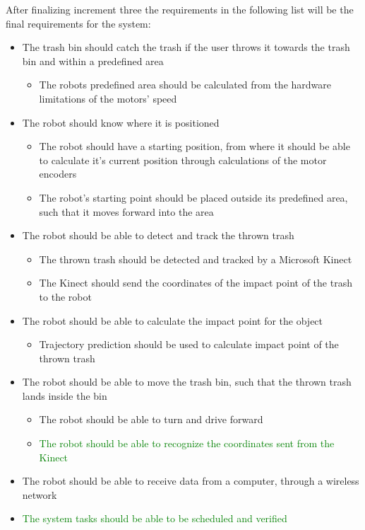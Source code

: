 
After finalizing increment three the requirements in the following list will be the final requirements for the system:

\begin{itemize}
	\item The trash bin should catch the trash if the user throws it towards the trash bin and within a predefined area
	\begin{itemize}
		\item {The robots predefined area should be calculated from the hardware limitations of the motors’ speed}
	\end{itemize}
	\item The robot should know where it is positioned
	\begin{itemize}
		\item {The robot should have a starting position, from where it should be able to calculate it's current position through calculations of the motor encoders}
		\item {The robot's starting point should be placed outside its predefined area, such that it moves forward into the area}
	\end{itemize}
	\item The robot should be able to detect and track the thrown trash
	\begin{itemize}
		\item {The thrown trash should be detected and tracked by a Microsoft Kinect}
		\item {The Kinect should send the coordinates of the impact point of the trash to the robot}
	\end{itemize}
	\item The robot should be able to calculate the impact point for the object
	\begin{itemize}
		\item {Trajectory prediction should be used to calculate impact point of the thrown trash}
	\end{itemize}
	\item The robot should be able to move the trash bin, such that the thrown trash lands inside the bin
	\begin{itemize}
		\item {The robot should be able to turn and drive forward}
		\item\textcolor{green}{The robot should be able to recognize the coordinates sent from the Kinect}
	\end{itemize}
	\item {The robot should be able to receive data from a computer, through a wireless network}
	\item \textcolor{green}{The system tasks should be able to be scheduled and verified}
\end{itemize}
